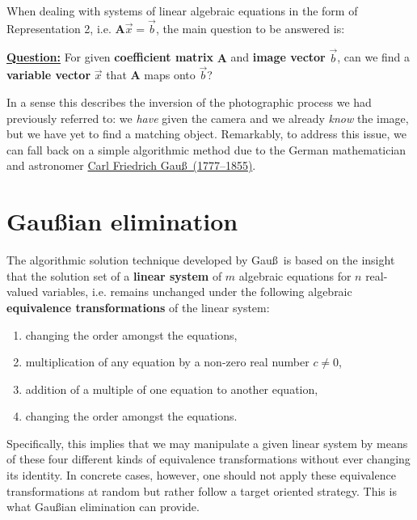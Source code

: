 \medskip
\noindent
When dealing with systems of linear algebraic equations in the 
form of Representation 2, i.e. $\mathbf{A}\vec{x} = \vec{b}$, the 
main question to be answered is:

\medskip
\noindent
\underline{\bf Question:}
For given {\bf coefficient matrix} $\mathbf{A}$ and {\bf image 
vector} $\vec{b}$, can we find a {\bf variable vector} $\vec{x}$ 
that $\mathbf{A}$ maps onto $\vec{b}$?

\medskip
\noindent
In a sense this describes the inversion of the photographic 
process we had previously referred to: we \emph{have} given the 
camera and we already \emph{know} the image, but we have yet to 
find a matching object. Remarkably, to address this issue, we can 
fall back on a simple algorithmic method due to the German 
mathematician and astronomer 
\href{http://www-groups.dcs.st-and.ac.uk/~history/Biographies/Gauss.html}{Carl Friedrich Gau\ss\ (1777--1855)}.

\section[Gau\ss ian elimination]%
{Gau\ss ian elimination}
The algorithmic solution technique developed by Gau\ss\ is based 
on the insight that the solution set of a {\bf linear system} of 
$m$ algebraic equations for $n$ real-valued variables, i.e.
%
\be
{}
\ee
%
remains unchanged under the following algebraic {\bf equivalence 
transformations} of the linear system:
%
\begin{enumerate}
\item changing the order amongst the equations,
\item multiplication of any equation by a non-zero real number $c \neq 0$,
\item addition of a multiple of one equation to another equation,
\item changing the order amongst the equations.
\end{enumerate}
%
Specifically, this implies that we may manipulate a given linear 
system by means of these four different kinds of equivalence 
transformations without ever changing its identity. In concrete 
cases, however, one should not apply these equivalence 
transformations at random but rather follow a target oriented 
strategy. This is what Gau\ss ian elimination can provide.

